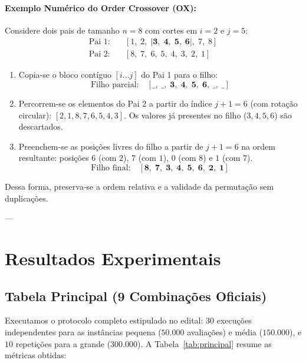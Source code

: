 \documentclass[11pt,a4paper]{article}
\begin{document}
\paragraph{Exemplo Numérico do Order Crossover (OX):}
Considere dois pais de tamanho $n = 8$ com cortes em $i = 2$ e $j = 5$:
\begin{align*}
\text{Pai 1:} & \quad [1, \; 2, \; |\mathbf{3, \; 4, \; 5, \; 6}|, \; 7, \; 8] \\
\text{Pai 2:} & \quad [8, \; 7, \; 6, \; 5, \; 4, \; 3, \; 2, \; 1]
\end{align*}
\begin{enumerate}
    \item Copia-se o bloco contíguo $[i \dots j]$ do Pai 1 para o filho:
    $$\text{Filho parcial:} \quad [\_, \; \_, \; \mathbf{3, \; 4, \; 5, \; 6}, \; \_, \; \_]$$
    \item Percorrem-se os elementos do Pai 2 a partir do índice $j+1 = 6$ (com rotação circular): $[2, 1, 8, 7, 6, 5, 4, 3]$. Os valores já presentes no filho ($3, 4, 5, 6$) são descartados.
    \item Preenchem-se as posições livres do filho a partir de $j+1 = 6$ na ordem resultante: posições $6$ (com $2$), $7$ (com $1$), $0$ (com $8$) e $1$ (com $7$).
    $$\text{Filho final:} \quad [\mathbf{8}, \; \mathbf{7}, \; \mathbf{3}, \; \mathbf{4}, \; \mathbf{5}, \; \mathbf{6}, \; \mathbf{2}, \; \mathbf{1}]$$
\end{enumerate}
Dessa forma, preserva-se a ordem relativa e a validade da permutação sem duplicações.

---

\section{Resultados Experimentais}

\subsection{Tabela Principal (9 Combinações Oficiais)}
Executamos o protocolo completo estipulado no edital: $30$ execuções independentes para as instâncias pequena ($50.000$ avaliações) e média ($150.000$), e $10$ repetições para a grande ($300.000$). A Tabela~\ref{tab:principal} resume as métricas obtidas:
\end{document}
